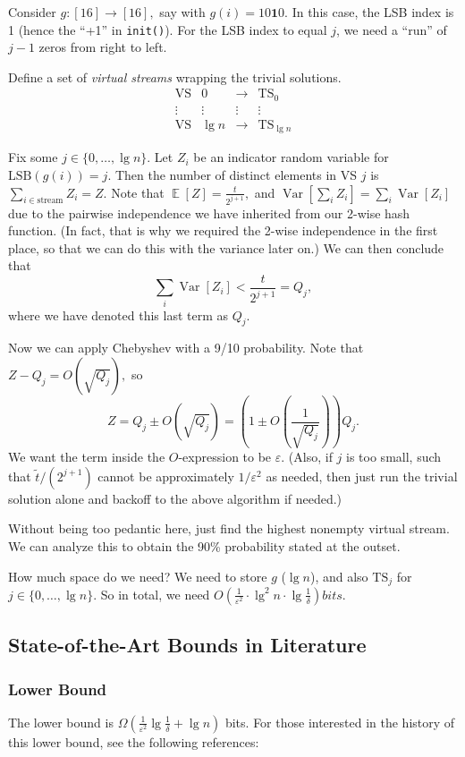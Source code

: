 \documentclass[11pt]{article}
\DeclareMathOperator*{\E}{\mathbb{E}}
\DeclareMathOperator*{\Var}{\operatorname{Var}}
\newcommand{\eps}{\varepsilon}
\begin{document}
Consider $g : [16] \to [16],$ say with $g(i) = 1 0 \textbf{1} 0.$ In this case, the LSB index is 1 (hence the ``+1'' in \texttt{init()}). For the LSB index to equal $j$, we need a ``run'' of $j-1$ zeros from right to left.

Define a set of \emph{virtual streams} wrapping the trivial solutions. $$\begin{array}{rlcc}
\mathrm{VS} & 0 & \longrightarrow & \mathrm{TS}_0 \\
\vdots & \vdots & \vdots & \vdots \\
\mathrm{VS} & \lg n & \longrightarrow & \mathrm{TS}_{\lg n}
\end{array}$$

Fix some $j \in \{0, \dots, \lg n\}.$ Let $Z_i$ be an indicator random variable for $\mathrm{LSB}(g(i)) = j.$ Then the number of distinct elements in VS $j$ is $\sum_{i \in \text{stream}} Z_i = Z.$ Note that $\E[Z] = \frac{t}{2^{j+1}},$ and $\Var[\sum_i Z_i] = \sum_i \Var[Z_i]$ due to the pairwise independence we have inherited from our 2-wise hash function. (In fact, that is why we required the 2-wise independence in the first place, so that we can do this with the variance later on.) We can then conclude that $$\sum_i \Var[Z_i] < \frac{t}{2^{j+1}} = Q_j,$$ where we have denoted this last term as $Q_j.$

Now we can apply Chebyshev with a 9/10 probability. Note that $Z - Q_j = O(\sqrt{Q_j}),$ so $$Z = Q_j \pm O(\sqrt{Q_j}) = \left(1 \pm O\left(\frac{1}{\sqrt{Q_j}}\right)\right) Q_j.$$ We want the term inside the $O$-expression to be $\eps.$ (Also, if $j$ is too small, such that $\tilde{t}/(2^{j+1})$ cannot be approximately $1/\eps^2$ as needed, then just run the trivial solution alone and backoff to the above algorithm if needed.)

Without being too pedantic here, just find the highest nonempty virtual stream. We can analyze this to obtain the 90\% probability stated at the outset.

How much space do we need? We need to store $g$ ($\lg{n}$), and also $\mathrm{TS}_j$ for $j \in \{0, \dots, \lg{n}\}.$ So in total, we need $O\left(\frac{1}{\eps^2}\cdot \lg^2{n} \cdot \lg \frac{1}{\delta} \right) bits.$

\subsection{State-of-the-Art Bounds in Literature}

\subsubsection{Lower Bound} The lower bound is $\displaystyle \Omega\left(\frac{1}{\eps^2} \lg{\frac{1}{\delta}} + \lg{n}\right)$ bits. For those interested in the history of this lower bound, see the following references:
\end{document}
